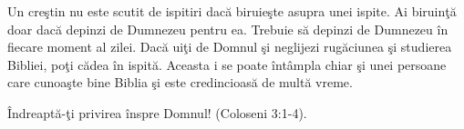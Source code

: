 Un creştin nu este scutit de ispitiri dacă biruieşte asupra unei ispite. Ai biruinţă doar dacă depinzi de Dumnezeu pentru ea. Trebuie să depinzi de Dumnezeu în fiecare moment al zilei. Dacă uiţi de Domnul şi neglijezi rugăciunea şi studierea Bibliei, poţi cădea în ispită. Aceasta i se poate întâmpla chiar şi unei persoane care cunoaşte bine Biblia şi este credincioasă de multă vreme.

Îndreaptă-ţi privirea înspre Domnul! (Coloseni 3:1-4).

